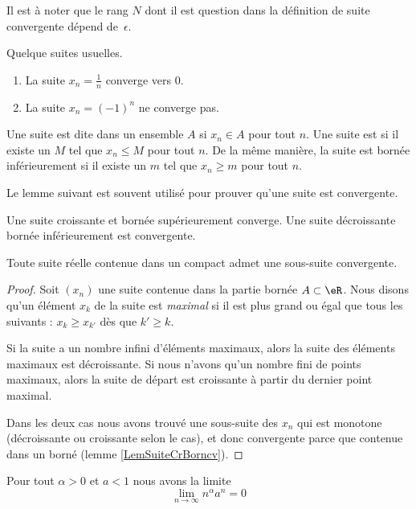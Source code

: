 Il est à noter que le rang $N$ dont il est question dans la définition de suite convergente dépend de~$\epsilon$.

\begin{example}
	Quelque suites usuelles.
	\begin{enumerate}
		\item
			La suite $x_n=\frac{1}{ n }$ converge vers $0$.
		\item
			La suite $x_n=(-1)^n$ ne converge pas.
	\end{enumerate}
\end{example}

Une suite est dite  dans un ensemble $A$ si $x_n\in A$ pour tout $n$. Une suite est  si il existe un $M$ tel que $x_n\leq M$ pour tout $n$. De la même manière, la suite est bornée inférieurement si il existe un $m$ tel que $x_n\geq m$ pour tout $n$.

Le lemme suivant est souvent utilisé pour prouver qu'une suite est convergente.
\begin{lemma}		\label{LemSuiteCrBorncv}
	Une suite croissante et bornée supérieurement converge. Une suite décroissante bornée inférieurement est convergente.
\end{lemma}

\begin{theorem}
	Toute suite réelle contenue dans un compact admet une sous-suite convergente.
\end{theorem}

\begin{proof}
	Soit $(x_n)$ une suite contenue dans la partie bornée $A\subset\eR$. Nous disons qu'un élément $x_k$ de la suite est \emph{maximal} si il est plus grand ou égal que tous les suivants : $x_k\geq x_{k'}$ dès que $k'\geq k$.

	Si la suite a un nombre infini d'éléments maximaux, alors la suite des éléments maximaux est décroissante. Si nous n'avons qu'un nombre fini de points maximaux, alors la suite de départ est croissante à partir du dernier point maximal.

	Dans les deux cas nous avons trouvé une sous-suite des $x_n$ qui est monotone (décroissante ou croissante selon le cas), et donc convergente parce que contenue dans un borné (lemme \ref{LemSuiteCrBorncv}).
\end{proof}

\begin{lemma}       \label{LemLJOSooEiNtTs}
     Pour tout \( \alpha>0\) et \( a<1\) nous avons la limite
     \begin{equation}
         \lim_{n\to \infty} n^{\alpha}a^n=0
     \end{equation}
\end{lemma}

